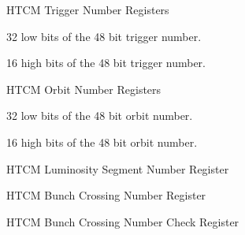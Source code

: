 \begin{register}{H}{TCM Trigger Number Registers}{}%
    \label{tcm_trigger_nr}
    \begin{regdesc}
    \begin{reglist}
        \item [trigger\_nr\_l] 32 low bits of the 48 bit trigger number.
        \item [trigger\_nr\_h] 16 high bits of the 48 bit trigger number.
    \end{reglist}
    \end{regdesc}
\end{register}

\begin{register}{H}{TCM Orbit Number Registers}{}%
    \label{tcm_orbit_nr}
    \begin{regdesc}
    \begin{reglist}
        \item [orbit\_nr\_l] 32 low bits of the 48 bit orbit number.
        \item [orbit\_nr\_h] 16 high bits of the 48 bit orbit number.
    \end{reglist}
    \end{regdesc}
\end{register}

\begin{register}{H}{TCM Luminosity Segment Number Register}{}%
    \label{lum_seg_nr}
    \begin{regdesc}
    \end{regdesc}
\end{register}

\begin{register}{H}{TCM Bunch Crossing Number \ufdl Register}{}%
    \label{tcm_bx_nr_fdl}
    \begin{regdesc}
    \end{regdesc}
\end{register}

\begin{register}{H}{TCM Bunch Crossing Number Check Register}{}%
    \label{tcm_bx_nr_chk}
    \begin{regdesc}
    \end{regdesc}
\end{register}

